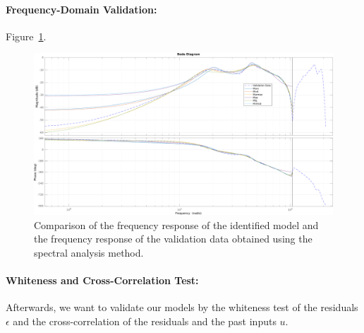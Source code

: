 \paragraph{Frequency-Domain Validation: } Figure~\ref{fig:comparison_freq}.

\begin{figure}[h]
	\centering
	\includegraphics[width=\textwidth]{figures/bode_parametric.pdf}
	\caption{Comparison of the frequency response of the identified model and the frequency response of the validation data obtained using the spectral analysis method.}
	\label{fig:comparison_freq}
\end{figure}

\paragraph{Whiteness and Cross-Correlation Test: }
Afterwards, we want to validate our models by the whiteness test of the residuals $\epsilon$ and the cross-correlation of the residuals and the past inputs $u$.

